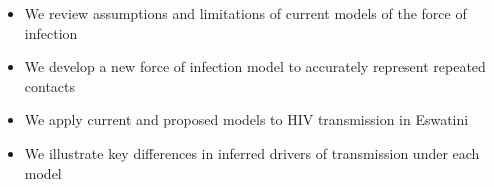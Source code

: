 \begin{itemize}
  \item We review assumptions and limitations of current models of the force of infection
  \item We develop a new force of infection model to accurately represent repeated contacts
  \item We apply current and proposed models to HIV transmission in Eswatini
  \item We illustrate key differences in inferred drivers of transmission under each model
\end{itemize}
